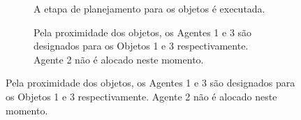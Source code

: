 \begin{figure}[htpb]
  \centering
  \setlength{\fboxsep}{0pt}
  \begin{subfigure}[t]{0.45\textwidth}
    \centering
    \caption{A etapa de planejamento para os objetos é executada.}
  \end{subfigure}
  \hspace{0.2cm}
  \begin{subfigure}[t]{0.45\textwidth}
    \centering
    \caption{Pela proximidade dos objetos, os Agentes 1 e 3 são designados para os Objetos 1 e 3 respectivamente. Agente 2 não é alocado neste momento.}
  \end{subfigure}


\end{figure}
